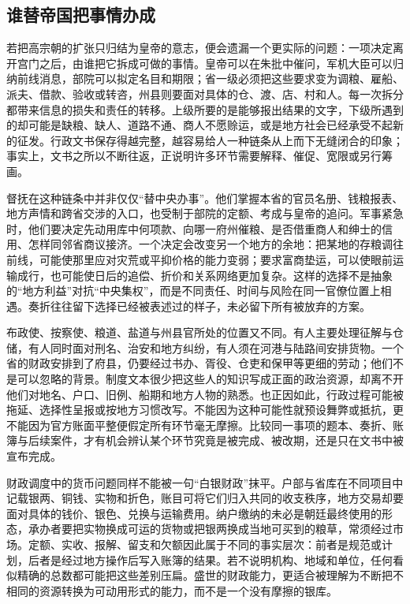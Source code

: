 \subsection{谁替帝国把事情办成}

若把高宗朝的扩张只归结为皇帝的意志，便会遗漏一个更实际的问题：一项决定离开宫门之后，由谁把它拆成可做的事情。皇帝可以在朱批中催问，军机大臣可以归纳前线消息，部院可以拟定名目和期限；省一级必须把这些要求变为调粮、雇船、派夫、借款、验收或转咨，州县则要面对具体的仓、渡、店、村和人。每一次拆分都带来信息的损失和责任的转移。上级所要的是能够报出结果的文字，下级所遇到的却可能是缺粮、缺人、道路不通、商人不愿赊运，或是地方社会已经承受不起新的征发。行政文书保存得越完整，越容易给人一种链条从上而下无缝闭合的印象；事实上，文书之所以不断往返，正说明许多环节需要解释、催促、宽限或另行筹画。

督抚在这种链条中并非仅仅“替中央办事”。他们掌握本省的官员名册、钱粮报表、地方声情和跨省交涉的入口，也受制于部院的定额、考成与皇帝的追问。军事紧急时，他们要决定先动用库中何项款、向哪一府州催粮、是否借重商人和绅士的信用、怎样同邻省商议接济。一个决定会改变另一个地方的余地：把某地的存粮调往前线，可能使那里应对灾荒或平抑价格的能力变弱；要求富商垫运，可以使眼前运输成行，也可能使日后的追偿、折价和关系网络更加复杂。这样的选择不是抽象的“地方利益”对抗“中央集权”，而是不同责任、时间与风险在同一官僚位置上相遇。奏折往往留下选择已经被表述过的样子，未必留下所有被放弃的方案。

布政使、按察使、粮道、盐道与州县官所处的位置又不同。有人主要处理征解与仓储，有人同时面对刑名、治安和地方纠纷，有人须在河港与陆路间安排货物。一个省的财政安排到了府县，仍要经过书办、胥役、仓吏和保甲等更细的劳动；他们不是可以忽略的背景。制度文本很少把这些人的知识写成正面的政治资源，却离不开他们对地名、户口、旧例、船期和地方人物的熟悉。也正因如此，行政过程可能被拖延、选择性呈报或按地方习惯改写。不能因为这种可能性就预设舞弊或抵抗，更不能因为官方账面平整便假定所有环节毫无摩擦。比较同一事项的题本、奏折、账簿与后续案件，才有机会辨认某个环节究竟是被完成、被改期，还是只在文书中被宣布完成。

财政调度中的货币问题同样不能被一句“白银财政”抹平。户部与省库在不同项目中记载银两、铜钱、实物和折色，账目可将它们归入共同的收支秩序，地方交易却要面对具体的钱价、银色、兑换与运输费用。纳户缴纳的未必是朝廷最终使用的形态，承办者要把实物换成可运的货物或把银两换成当地可买到的粮草，常须经过市场。定额、实收、报解、留支和欠额因此属于不同的事实层次：前者是规范或计划，后者是经过地方操作后写入账簿的结果。若不说明机构、地域和单位，任何看似精确的总数都可能把这些差别压扁。盛世的财政能力，更适合被理解为不断把不相同的资源转换为可动用形式的能力，而不是一个没有摩擦的银库。

